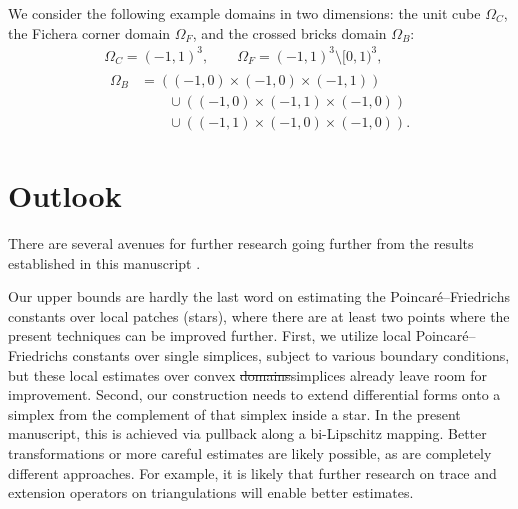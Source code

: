 \documentclass[10pt,letterpaper]{article}
\newcommand\cye[1]{%
  \protect\leavevmode
  \begingroup
    \color{red!35!yellow}%
    #1%
  \endgroup
}
\begin{document}
We consider the following example domains in two dimensions:
the unit cube $\Omega_C$, the Fichera corner domain $\Omega_F$, and the crossed bricks domain $\Omega_{B}$:
\begin{gather*}
    \Omega_{C}  = (-1,1)^3,
    \qquad 
    \Omega_{F}  = (-1,1)^3 \setminus [0,1)^3,
    \\
    \begin{aligned}
    \Omega_{B} &= 
    \left( (-1,0) \times (-1,0) \times (-1,1) \right)
    \\&\qquad
    \cup 
    \left( (-1,0) \times (-1,1) \times (-1,0) \right)
    \\&\qquad
    \cup 
    \left( (-1,1) \times (-1,0) \times (-1,0) \right)
    .
    \end{aligned}
\end{gather*}


\section{\cye{Outlook}}  \label{section:outlook}

There are several avenues for further research going \cye{further from the results established in this manuscript}.
 
\cye{Our} upper bounds are hardly the last word on estimating the Poincar\'e--Friedrichs constants over local patches (stars), where there are at least two points where the present techniques can be improved further. First, we utilize local Poincar\'e--Friedrichs constants over single simplices, subject to various boundary conditions, but these local estimates over convex \cye{\sout{domains}simplices}  \cye{already} leave room for improvement.
Second, our construction needs to extend differential forms onto a simplex from the complement of that simplex inside a star. In the present manuscript, this is achieved via pullback along a bi-Lipschitz mapping. 
Better transformations or more careful estimates are likely possible, as are completely different approaches. For example, it is likely that further research on trace and extension operators on triangulations will enable better estimates.
\end{document}
